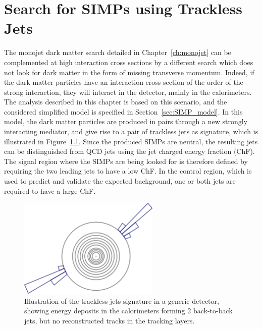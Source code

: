 \graphicspath{{chapt_dutch/}{intro/}{simps/}}

\renewcommand\evenpagerightmark{{\scshape\small Chapter 6}}
\renewcommand\oddpageleftmark{{\scshape\small Search for SIMPs using Trackless Jets}}

\renewcommand{\bibname}{References}

\hyphenation{}


\chapter{Search for SIMPs using Trackless Jets}
\label{ch:SIMPs}

The monojet dark matter search detailed in Chapter~\ref{ch:monojet} can be complemented at high interaction cross sections by a different search which does not look for dark matter in the form of missing transverse momentum. Indeed, if the dark matter particles have an interaction cross section of the order of the strong interaction, they will interact in the detector, mainly in the calorimeters. The analysis described in this chapter is based on this scenario, and the considered simplified model is specified in Section~\ref{sec:SIMP_model}. In this model, the dark matter particles are produced in pairs through a new strongly interacting mediator, and give rise to a pair of trackless jets as signature, which is illustrated in Figure~\ref{fig:tracklessjets}. Since the produced \acfp{SIMP} are neutral, the resulting jets can be distinguished from \ac{QCD} jets using the jet charged energy fraction (ChF). The signal region where the \acp{SIMP} are being looked for is therefore defined by requiring the two leading jets to have a low ChF. In the control region, which is used to predict and validate the expected background, one or both jets are required to have a large ChF.

\begin{figure}[ht]
  \centering
  \includegraphics[width=0.6\textwidth]{figures/SIMP.png}
  \caption{Illustration of the trackless jets signature in a generic detector, showing energy deposits in the calorimeters forming 2 back-to-back jets, but no reconstructed tracks in the tracking layers.}
  \label{fig:tracklessjets}
\end{figure} 

